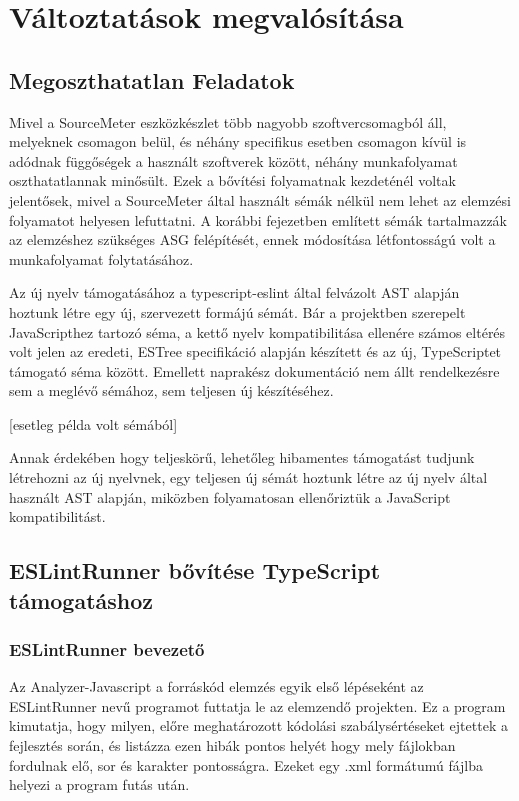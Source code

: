 \chapter{Változtatások megvalósítása}
\label{chap:fejezet4}

\section{Megoszthatatlan Feladatok}

Mivel a SourceMeter eszközkészlet több nagyobb szoftvercsomagból áll, melyeknek csomagon belül, és néhány specifikus esetben csomagon kívül is adódnak függőségek a használt szoftverek között, néhány munkafolyamat oszthatatlannak minősült. Ezek a bővítési folyamatnak kezdeténél voltak jelentősek, mivel a SourceMeter által használt sémák nélkül nem lehet az elemzési folyamatot helyesen lefuttatni. A korábbi fejezetben említett sémák tartalmazzák az elemzéshez szükséges ASG felépítését, ennek módosítása létfontosságú volt a munkafolyamat folytatásához.

Az új nyelv támogatásához a typescript-eslint által felvázolt AST alapján hoztunk létre egy új, szervezett formájú sémát. Bár a projektben szerepelt JavaScripthez tartozó séma, a kettő nyelv kompatibilitása ellenére számos eltérés volt jelen az eredeti, ESTree specifikáció alapján készített és az új, TypeScriptet támogató séma között. Emellett naprakész dokumentáció nem állt rendelkezésre sem a meglévő sémához, sem teljesen új készítéséhez.

[esetleg példa volt sémából] 

Annak érdekében hogy teljeskörű, lehetőleg hibamentes támogatást tudjunk létrehozni az új nyelvnek, egy teljesen új sémát hoztunk létre az új nyelv által használt AST alapján, miközben folyamatosan ellenőriztük a JavaScript kompatibilitást. 

\section{ESLintRunner bővítése TypeScript támogatáshoz}

\subsection{ESLintRunner bevezető}
Az Analyzer-Javascript a forráskód elemzés egyik első lépéseként az ESLintRunner nevű programot futtatja le az elemzendő projekten. Ez a program kimutatja, hogy milyen, előre meghatározott kódolási szabálysértéseket ejtettek a fejlesztés során, és listázza ezen hibák pontos helyét hogy mely fájlokban fordulnak elő, sor és karakter pontosságra. Ezeket egy .xml formátumú fájlba helyezi a program futás után.

